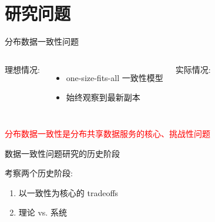\section{研究问题}

\begin{frame}{分布数据一致性问题}
  \begin{columns}[t]
	  理想情况:
	  \begin{itemize}
		\item one-size-fits-all 一致性模型
		\item 始终观察到最新副本
	  \end{itemize}
    \pause
	  实际情况:
  \end{columns}
  \pause
  \vspace{0.50cm}
  \begin{center}
	\textcolor{red}{分布数据一致性是分布共享数据服务的核心、挑战性问题}
  \end{center}
\end{frame}
%       
\begin{frame}{数据一致性问题研究的历史阶段}
  \begin{center}
	考察两个历史阶段:
	\begin{enumerate}
	  \centering
	  \item 以一致性为核心的 tradeoffs
	  \item 理论 vs. 系统
	\end{enumerate}
  \end{center}
\end{frame}
